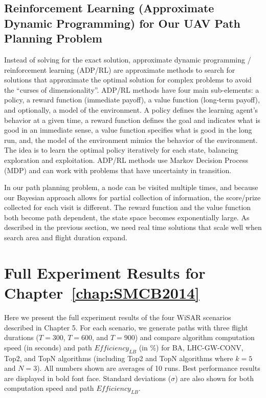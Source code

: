 \section{Reinforcement Learning (Approximate Dynamic Programming) for Our UAV Path Planning Problem}
\label{RLUAV}

Instead of solving for the exact solution, approximate dynamic programming / reinforcement learning (ADP/RL) are approximate methods to search for solutions that approximate the optimal solution for complex problems to avoid the ``curses of dimensionality''. ADP/RL methods have four main sub-elements: a policy, a reward function (immediate payoff), a value function (long-term payoff), and optionally, a model of the environment. A policy defines the learning agent's behavior at a given time, a reward function defines the goal and indicates what is good in an immediate sense, a value function specifies what is good in the long run, and, the model of the environment mimics the behavior of the environment. The idea is to learn the optimal policy iteratively for each state, balancing exploration and exploitation. ADP/RL methods use Markov Decision Process (MDP) and can work with problems that have uncertainty in transition.

In our path planning problem, a node can be visited multiple times, and because our Bayesian approach allows for partial collection of information, the score/prize collected for each visit is different. The reward function and the value function both become path dependent, the state space becomes exponentially large. As described in the previous section, we need real time solutions that scale well when search area and flight duration expand.

\chapter{Full Experiment Results for Chapter~\ref{chap:SMCB2014}}
\label{chap:result}

Here we present the full experiment results of the four WiSAR scenarios described in Chapter 5. For each scenario, we generate paths with three flight durations ($T=300$, $T=600$, and $T=900$) and compare algorithm computation speed (in seconds) and path $\mathit{Efficiency_{LB}}$ (in \%) for BA, LHC-GW-CONV, Top2, and TopN algorithms (including Top2 and TopN algorithms where $k=5$ and $N=3$). All numbers shown are averages of 10 runs. Best performance results are displayed in bold font face. Standard deviations ($\sigma$) are also shown for both computation speed and path $\mathit{Efficiency_{LB}}$.

